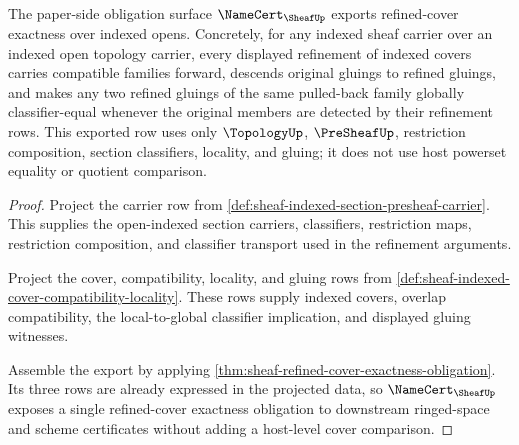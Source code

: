 \begin{theorem}
\label{thm:sheaf-namecert-refinement-exactness-export}
The paper-side obligation surface $\NameCert_{\SheafUp}$ exports refined-cover exactness over indexed opens. Concretely, for any indexed sheaf carrier over an indexed open topology carrier, every displayed refinement of indexed covers carries compatible families forward, descends original gluings to refined gluings, and makes any two refined gluings of the same pulled-back family globally classifier-equal whenever the original members are detected by their refinement rows. This exported row uses only $\TopologyUp$, $\PreSheafUp$, restriction composition, section classifiers, locality, and gluing; it does not use host powerset equality or quotient comparison.
\end{theorem}
\begin{proof}
Project the carrier row from \autoref{def:sheaf-indexed-section-presheaf-carrier}. This supplies the open-indexed section carriers, classifiers, restriction maps, restriction composition, and classifier transport used in the refinement arguments.

Project the cover, compatibility, locality, and gluing rows from \autoref{def:sheaf-indexed-cover-compatibility-locality}. These rows supply indexed covers, overlap compatibility, the local-to-global classifier implication, and displayed gluing witnesses.

Assemble the export by applying \autoref{thm:sheaf-refined-cover-exactness-obligation}. Its three rows are already expressed in the projected data, so $\NameCert_{\SheafUp}$ exposes a single refined-cover exactness obligation to downstream ringed-space and scheme certificates without adding a host-level cover comparison.
\end{proof}
